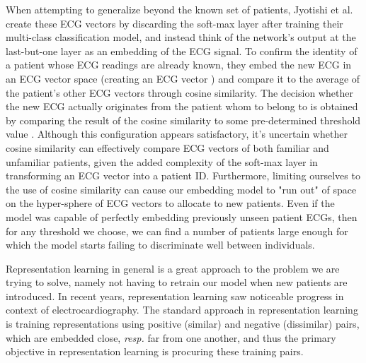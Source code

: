 \documentclass[preprint,12pt]{elsarticle}
\begin{document}
When attempting to generalize beyond the known set of patients, Jyotishi et al. \cite{jyotishi2021ecg} create these ECG vectors by discarding the soft-max layer after training their multi-class classification model, and instead think of the network's output at the last-but-one layer as an embedding of the ECG signal. To confirm the identity of a patient whose ECG readings are already known, they embed the new ECG in an ECG vector space (creating an ECG vector ) and compare it to the average of the patient's other ECG vectors  through cosine similarity. The decision whether the new ECG actually originates from the patient whom  to  belong to is obtained by comparing the result of the cosine similarity to some pre-determined threshold value \cite{jyotishi2021ecg}. Although this configuration appears satisfactory, it's uncertain whether cosine similarity can effectively compare ECG vectors of both familiar and unfamiliar patients, given the added complexity of the soft-max layer in transforming an ECG vector into a patient ID. Furthermore, limiting ourselves to the use of cosine similarity can cause our embedding model to "run out" of space on the hyper-sphere of ECG vectors to allocate to new patients. Even if the model was capable of perfectly embedding previously unseen patient ECGs, then for any threshold we choose, we can find a number of patients large enough for which the model starts failing to discriminate well between individuals. 

Representation learning in general is a great approach to the problem we are trying to solve, namely not having to retrain our model when new patients are introduced. In recent years, representation learning saw noticeable progress in context of electrocardiography. The standard approach in representation learning is training representations using positive (similar) and negative (dissimilar) pairs, which are embedded close, \textit{resp.} far from one another, and thus the primary objective in representation learning is procuring these training pairs.
\end{document}
